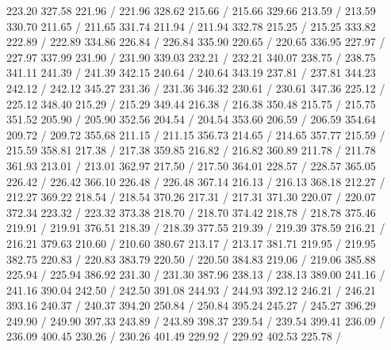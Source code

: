 { 223.20 327.58 221.96 /
 221.96 328.62 215.66 /
 215.66 329.66 213.59 /
 213.59 330.70 211.65 /
 211.65 331.74 211.94 /
 211.94 332.78 215.25 /
 215.25 333.82 222.89 /
 222.89 334.86 226.84 /
 226.84 335.90 220.65 /
 220.65 336.95 227.97 /
 227.97 337.99 231.90 /
 231.90 339.03 232.21 /
 232.21 340.07 238.75 /
 238.75 341.11 241.39 /
 241.39 342.15 240.64 /
 240.64 343.19 237.81 /
 237.81 344.23 242.12 /
 242.12 345.27 231.36 /
 231.36 346.32 230.61 /
 230.61 347.36 225.12 /
 225.12 348.40 215.29 /
 215.29 349.44 216.38 /
 216.38 350.48 215.75 /
 215.75 351.52 205.90 /
 205.90 352.56 204.54 /
 204.54 353.60 206.59 /
 206.59 354.64 209.72 /
 209.72 355.68 211.15 /
 211.15 356.73 214.65 /
 214.65 357.77 215.59 /
 215.59 358.81 217.38 /
 217.38 359.85 216.82 /
 216.82 360.89 211.78 /
 211.78 361.93 213.01 /
 213.01 362.97 217.50 /
 217.50 364.01 228.57 /
 228.57 365.05 226.42 /
 226.42 366.10 226.48 /
 226.48 367.14 216.13 /
 216.13 368.18 212.27 /
 212.27 369.22 218.54 /
 218.54 370.26 217.31 /
 217.31 371.30 220.07 /
 220.07 372.34 223.32 /
 223.32 373.38 218.70 /
 218.70 374.42 218.78 /
 218.78 375.46 219.91 /
 219.91 376.51 218.39 /
 218.39 377.55 219.39 /
 219.39 378.59 216.21 /
 216.21 379.63 210.60 /
 210.60 380.67 213.17 /
 213.17 381.71 219.95 /
 219.95 382.75 220.83 /
 220.83 383.79 220.50 /
 220.50 384.83 219.06 /
 219.06 385.88 225.94 /
 225.94 386.92 231.30 /
 231.30 387.96 238.13 /
 238.13 389.00 241.16 /
 241.16 390.04 242.50 /
 242.50 391.08 244.93 /
 244.93 392.12 246.21 /
 246.21 393.16 240.37 /
 240.37 394.20 250.84 /
 250.84 395.24 245.27 /
 245.27 396.29 249.90 /
 249.90 397.33 243.89 /
 243.89 398.37 239.54 /
 239.54 399.41 236.09 /
 236.09 400.45 230.26 /
 230.26 401.49 229.92 /
 229.92 402.53 225.78 /
}
